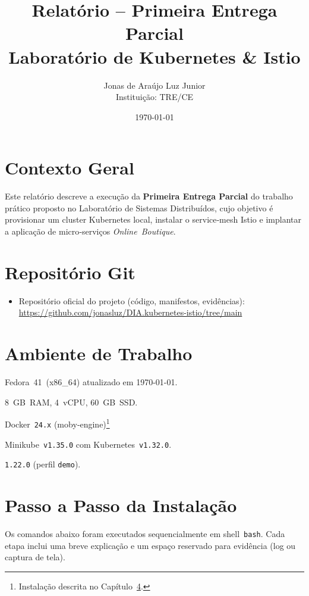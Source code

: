 \documentclass[12pt,a4paper]{report}
\title{Relatório – Primeira Entrega Parcial\\Laboratório de Kubernetes & Istio}
\author{Jonas de Araújo Luz Junior\\\small{Instituição: TRE/CE}}
\date{\today}
\begin{document}
\maketitle
\tableofcontents
\clearpage

\chapter{Contexto Geral}
Este relatório descreve a execução da \textbf{Primeira Entrega Parcial} do trabalho
prático proposto no Laboratório de Sistemas Distribuídos, cujo objetivo é
provisionar um cluster Kubernetes local, instalar o service‑mesh Istio e
implantar a aplicação de micro‑serviços \emph{Online Boutique}.

\chapter{Repositório Git}
\begin{itemize}[leftmargin=*]
  \item Repositório oficial do projeto (código, manifestos, evidências):\\
  \url{https://github.com/jonasluz/DIA.kubernetes-istio/tree/main}
\end{itemize}

\chapter{Ambiente de Trabalho}
\begin{description}[leftmargin=1.5cm]
  \item[Sistema] Fedora 41 (x86\_64) atualizado em \today.
  \item[Recursos] 8 GB RAM, 4 vCPU, 60 GB SSD.
  \item[Container Runtime] Docker \texttt{24.x} (moby‑engine)\footnote{Instalação descrita no Capítulo~\ref{chap:passoapasso}.}
  \item[Cluster] Minikube \texttt{v1.35.0} com Kubernetes \texttt{v1.32.0}.
  \item[Istio] \texttt{1.22.0} (perfil \texttt{demo}).
\end{description}

\chapter{Passo a Passo da Instalação}
\label{chap:passoapasso}
Os comandos abaixo foram executados sequencialmente em shell \texttt{bash}. Cada
etapa inclui uma breve explicação e um espaço reservado para evidência (log ou
captura de tela).
\end{document}
